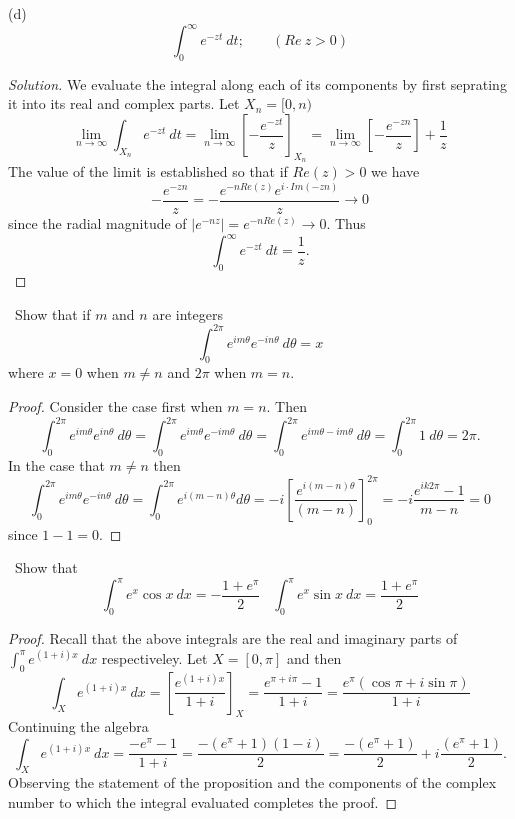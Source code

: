 \documentclass[11pt]{amsart}
\theoremstyle{definition}
\numberwithin{theorem}{section}
\numberwithin{definition}{section}
\numberwithin{equation}{section}
\newenvironment{solution}
  {\begin{proof}[Solution]}
  {\end{proof}}
\begin{document}
 \noindent (d) $$\int_0^\infty e^{-zt}\ dt;\;\;\;\;\;\;\;(Re\  z > 0)$$
 	\begin{solution}
	We evaluate the integral along each of its components by first seprating it into its real
	and complex parts. Let $X_n = [0,n)$
	\begin{equation*}
		\lim_{n\to\infty } \int_{X_n} e^{-zt}\ dt = \lim_{n\to \infty}\left[-\frac{e^{-zt}}{z}\right]_{X_n} = 
		\lim_{n\to\infty}  \left[-\frac{e^{-zn}}{z}\right] + \frac{1}{z}
	\end{equation*}
	The value of the limit is established so that if $Re(z) > 0$ we have
	\begin{equation*}
		-\frac{e^{-zn}}{z} = -\frac{e^{-nRe(z)}e^{i\cdot Im(-zn)}}{z} \to 0
	\end{equation*}
	since the radial magnitude of $|e^{-nz}| = e^{-nRe(z)} \to 0$. Thus
	\begin{equation*}
		\int_0^\infty e^{-zt}\ dt = \frac{1}{z}.
	\end{equation*}
 	\end{solution}
\medskip {}\ Show that if $m$ and $n$ are integers
\begin{equation*}
	\int_0^{2\pi} e^{im\theta}e^{-in\theta}\ d\theta = x
\end{equation*}
where $x = 0$ when $m \neq n$ and $2\pi$ when $m = n$.
\begin{proof}
	Consider the case first when $m =n$. Then 
	\begin{equation*}
		\int_0^{2\pi} e^{im\theta}e^{in\theta}\ d\theta = \int_0^{2\pi} e^{im\theta}e^{-im\theta}\ d\theta =\int_0^{2\pi} e^{im\theta-im\theta}\ d\theta = \int_0^{2\pi} 1\ d\theta = 2\pi.
	\end{equation*}
	In the case that $m \neq n$ then 
	\begin{equation*}
	\int_0^{2\pi} e^{im\theta}e^{-in\theta}\ d\theta = \int_0^{2\pi} e^{i(m -n)\theta} d\theta = -i\left[\frac{e^{i(m -n)\theta}}{(m-n)}\right]_0^{2\pi} = -i\frac{e^{ik2\pi} - 1}{m-n} =0
	\end{equation*}
	since $1 -1 = 0.$
\end{proof}
\medskip {}\ Show that \begin{equation*}
	\int_0^\pi e^x \cos x\ dx = -\frac{1 + e^{\pi}}{2}\;\;\; \int_0^\pi e^x \sin x\ dx = \frac{1 + e^{\pi}}{2}
\end{equation*}
\begin{proof}
	Recall that the above integrals are the real and imaginary parts of $\int_0^\pi e^{(1+i)x}\ dx$ respectiveley.  Let $X = [0, \pi]$ and then
	\begin{equation*}
		\int_X e^{(1+i)x}\ dx = \left[\frac{e^{(1+i)x}}{1+i}\right]_X = \frac{e^{\pi +i\pi} - 1}{1+i} = \frac{e^{\pi}(\cos \pi + i\sin \pi)}{1+i} 
	\end{equation*}
	Continuing the algebra
	\begin{equation*}
		\int_X e^{(1+i)x}\ dx = \frac{-e^{\pi} - 1}{1+i} = \frac{-(e^\pi + 1)(1 -i)}{2} = \frac{-(e^\pi + 1)}{2} + i \frac{(e^\pi + 1)}{2}.
	\end{equation*}
	Observing the statement of the proposition and the components of the complex number to which the integral evaluated completes the proof.
\end{proof}
\end{document}
